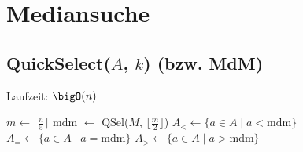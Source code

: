 \section*{Mediansuche}

\subsection*{QuickSelect($A$, $k$) (bzw. MdM)}
Laufzeit: $\bigO(n)$

\begin{algorithm}[H]
	$m \gets \lceil\frac{n}{5}\rceil$\;
	mdm $\gets$ QSel($M$, $\lfloor\frac{m}{2}\rfloor$)\;
	$A_{<} \gets \{a\in A \mid a < \text{mdm}\}$\;
	$A_{=} \gets \{a\in A \mid a = \text{mdm}\}$\;
	$A_{>} \gets \{a\in A \mid a > \text{mdm}\}$\;
\end{algorithm}
